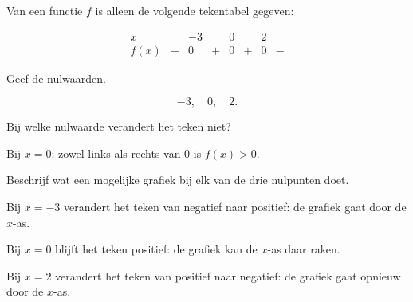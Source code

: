 \documentclass{ximera}
\begin{document}
\begin{oefening}{\oefU\ESS}

Van een functie \(f\) is alleen de volgende tekentabel gegeven:

\[
\begin{array}{c|ccccccc}
x &  & -3 &  & 0 &  & 2 & \\
\hline
f(x)&-&0&+&0&+&0&-
\end{array}
\]

\begin{question}
Geef de nulwaarden.

\begin{oplossing}
\[
-3,\quad 0,\quad 2.
\]
\end{oplossing}
\end{question}

\begin{question}
Bij welke nulwaarde verandert het teken niet?

\begin{oplossing}
Bij \(x=0\): zowel links als rechts van \(0\) is \(f(x)>0\).
\end{oplossing}
\end{question}

\begin{question}
Beschrijf wat een mogelijke grafiek bij elk van de drie nulpunten doet.

\begin{oplossing}
Bij \(x=-3\) verandert het teken van negatief naar positief:
de grafiek gaat door de \(x\)-as.

Bij \(x=0\) blijft het teken positief:
de grafiek kan de \(x\)-as daar raken.

Bij \(x=2\) verandert het teken van positief naar negatief:
de grafiek gaat opnieuw door de \(x\)-as.
\end{oplossing}
\end{question}

\end{oefening}
\end{document}
